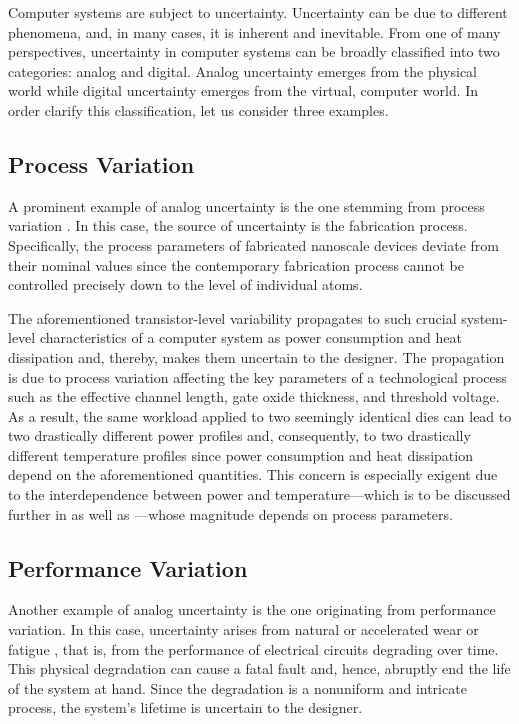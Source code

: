 Computer systems are subject to uncertainty. Uncertainty can be due to different
phenomena, and, in many cases, it is inherent and inevitable. From one of many
perspectives, uncertainty in computer systems can be broadly classified into two
categories: analog and digital. Analog uncertainty emerges from the physical
world while digital uncertainty emerges from the virtual, computer world. In
order clarify this classification, let us consider three examples.

\subsection{Process Variation}

A prominent example of analog uncertainty is the one stemming from process
variation \cite{chandrakasan2000, srivastava2010}. In this case, the source of
uncertainty is the fabrication process. Specifically, the process parameters of
fabricated nanoscale devices deviate from their nominal values since the
contemporary fabrication process cannot be controlled precisely down to the
level of individual atoms.

The aforementioned transistor-level variability propagates to such crucial
system-level characteristics of a computer system as power consumption and heat
dissipation and, thereby, makes them uncertain to the designer. The propagation
is due to process variation affecting the key parameters of a technological
process such as the effective channel length, gate oxide thickness, and
threshold voltage. As a result, the same workload applied to two seemingly
identical dies can lead to two drastically different power profiles and,
consequently, to two drastically different temperature profiles since power
consumption and heat dissipation depend on the aforementioned quantities. This
concern is especially exigent due to the interdependence between power and
temperature---which is to be discussed further in  as well as
---whose magnitude depends on process
parameters.

\subsection{Performance Variation}

Another example of analog uncertainty is the one originating from performance
variation. In this case, uncertainty arises from natural or accelerated wear or
fatigue \cite{jedec2016}, that is, from the performance of electrical circuits
degrading over time. This physical degradation can cause a fatal fault and,
hence, abruptly end the life of the system at hand. Since the degradation is a
nonuniform and intricate process, the system's lifetime is uncertain to the
designer.

